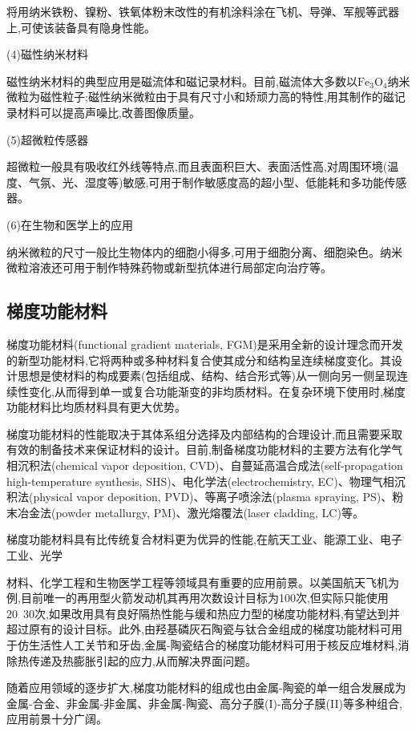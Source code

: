 \documentclass[UTF8]{ctexbook}
\newcommand{\◎}{\ensuremath{\bigcirc}}
\begin{document}
将用纳米铁粉、镍粉、铁氧体粉末改性的有机涂料涂在飞机、导弹、军舰等武器上,可使该装备具有隐身性能。

(4)磁性纳米材料

磁性纳米材料的典型应用是磁流体和磁记录材料。目前,磁流体大多数以$\mathrm{Fe_3O_4}$纳米微粒为磁性粒子;磁性纳米微粒由于具有尺寸小和矫顽力高的特性,用其制作的磁记录材料可以提高声噪比,改善图像质量。

(5)超微粒传感器

超微粒一般具有吸收红外线等特点,而且表面积巨大、表面活性高,对周围环境(温度、气氛、光、湿度等)敏感,可用于制作敏感度高的超小型、低能耗和多功能传感器。

(6)在生物和医学上的应用

纳米微粒的尺寸一般比生物体内的细胞小得多,可用于细胞分离、细胞染色。纳米微粒溶液还可用于制作特殊药物或新型抗体进行局部定向治疗等。

\subsection{梯度功能材料}

梯度功能材料(functional gradient materials, FGM)是采用全新的设计理念而开发的新型功能材料,它将两种或多种材料复合使其成分和结构呈连续梯度变化。其设计思想是使材料的构成要素(包括组成、结构、结合形式等)从一侧向另一侧呈现连续性变化,从而得到单一或复合功能渐变的非均质材料。在复杂环境下使用时,梯度功能材料比均质材料具有更大优势。

梯度功能材料的性能取决于其体系组分选择及内部结构的合理设计,而且需要采取有效的制备技术来保证材料的设计。目前,制备梯度功能材料的主要方法有化学气相沉积法(chemical vapor deposition, CVD)、自蔓延高温合成法(self-propagation high-temperature synthesis, SHS)、电化学法(electrochemistry, EC)、物理气相沉积法(physical vapor deposition, PVD)、等离子喷涂法(plasma spraying, PS)、粉末冶金法(powder metallurgy, PM)、激光熔覆法(laser cladding, LC)等。

梯度功能材料具有比传统复合材料更为优异的性能,在航天工业、能源工业、电子工业、光学

材料、化学工程和生物医学工程等领域具有重要的应用前景。以美国航天飞机为例,目前唯一的再用型火箭发动机其再用次数设计目标为100次,但实际只能使用20~30次,如果改用具有良好隔热性能与缓和热应力型的梯度功能材料,有望达到并超过原有的设计目标。此外,由羟基磷灰石陶瓷与钛合金组成的梯度功能材料可用于仿生活性人工关节和牙齿,金属-陶瓷结合的梯度功能材料可用于核反应堆材料,消除热传递及热膨胀引起的应力,从而解决界面问题。

随着应用领域的逐步扩大,梯度功能材料的组成也由金属-陶瓷的单一组合发展成为金属-合金、非金属-非金属、非金属-陶瓷、高分子膜(I)-高分子膜(II)等多种组合,应用前景十分广阔。
\end{document}
